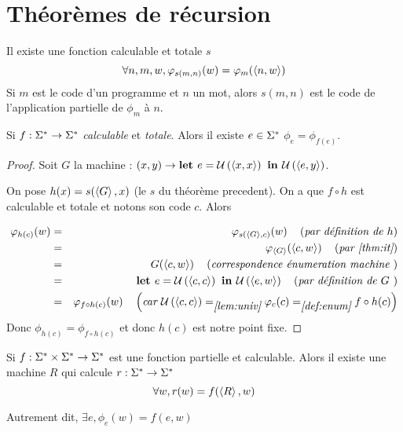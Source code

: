 \section{Théorèmes de récursion}


\begin{theorem}\label{thm:it}
	Il existe une fonction calculable et totale $s$ \tlq
	$$\forall n,m,w, \varphi_{s(m,n)}(w) = \varphi_m(\left\langle n,w\right\rangle)$$
	Si $m$ est le code d'un programme et $n$ un mot, alors $s(m,n)$ est le code de l'application partielle de $\phi_m$ à $n$.
\end{theorem}

\begin{theorem}
	Si $ f : \Sigma^{*} \to \Sigma^{*}$ \emph{calculable} et \emph {totale}. Alors il existe $e \in \Sigma^{*}$ \tq $\phi_e = \phi_{f(e)}$.
\end{theorem}


\begin{proof}
	Soit $G$ la machine : $(x,y) \to \textbf{let } e = \mathcal U \left(\left\langle x,x\right\rangle\right) \textbf{ in } {\mathcal U \left(\left\langle e,y\right\rangle\right)}$.

	On pose $h(x) = s(\left\langle G\right\rangle, x)$ (le $s$ du théorème precedent). On a que $f \circ h$ est calculable et totale et notons son code $c$. Alors

	\begin{eqnarray*}
		\varphi_{h(c)} (w) &=& \varphi_{s(\left\langle G\right\rangle, c)} (w) \quad\left(\textit{par définition de $h$}\right) \\
		&=& \varphi_{\left\langle G\right\rangle} (\left\langle c, w\right\rangle) \quad\left(\textit{par \ref{thm:it}}\right) \\
		&=& G (\left\langle c, w\right\rangle) \quad\left(\textit{correspondence énumeration machine }\right)\\
		&=& \textbf{let } e = \mathcal U \left(\left\langle c,c\right\rangle\right) \textbf{ in } \mathcal U \left(\left\langle e,w\right\rangle\right) \quad\left(\textit{par définition de $G$ }\right)\\
		&=& \varphi_{f \circ h (c)}(w) \quad\left(\textit{car $\mathcal U \left(\left\langle c,c\right\rangle\right) =_{\ref{lem:univ}} \varphi_c(c) =_{\ref{def:enum}} f \circ h (c)$}\right)
	\end{eqnarray*}
	Donc $\phi_{h(c)} = \phi_{f \circ h (c)}$ et donc $h(c)$ est notre point fixe.
\end{proof}


\begin{theorem}[de récursion]
	Si $f : \Sigma^{*} \times \Sigma^{*} \to \Sigma^{*}$ est une fonction partielle et calculable. Alors il existe une machine $R$ qui calcule $r : \Sigma^{*} \to \Sigma^{*} $ \tq
	$$ \forall w, r(w) =  f (\left\langle R\right\rangle, w)$$

	Autrement dit, $\exists e, \phi_e (w) = f (e, w)$
\end{theorem}


